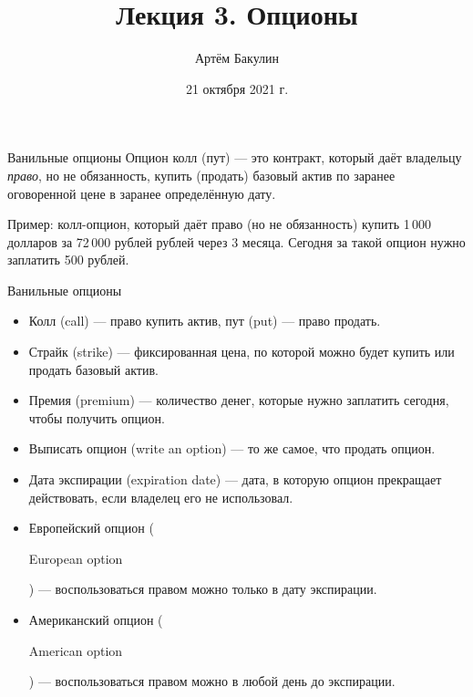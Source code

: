 \documentclass{beamer}
\title{Лекция 3. Опционы}
\author{Артём Бакулин}
\date{21 октября 2021 г.}
\newcommand{\en}[1]{\begin{otherlanguage}{english}#1\end{otherlanguage}}
\begin{document}
\begin{frame}
\titlepage
\end{frame}



\begin{frame}{Ванильные опционы}
\justifying
\alert{Опцион колл (пут)} --- это контракт, который даёт владельцу \textit{право}, но не обязанность, купить (продать) базовый актив по заранее оговоренной цене в заранее определённую дату. 

\justify
Пример: колл-опцион, который даёт право (но не обязанность) купить 1\,000 долларов за 72\,000 рублей рублей через 3 месяца. Сегодня за такой опцион нужно заплатить 500 рублей.
\end{frame}



\begin{frame}{Ванильные опционы}
\begin{itemize}
\justifying
\item Колл (call) --- право купить актив, пут (put) --- право продать.
\item Страйк (strike) --- фиксированная цена, по которой можно будет купить или продать базовый актив.
\item Премия (premium) --- количество денег, которые нужно заплатить сегодня, чтобы получить опцион.
\item Выписать опцион (write an option) --- то же самое, что продать опцион.
\item Дата экспирации (expiration date) --- дата, в которую опцион прекращает действовать, если владелец его не использовал.
\item Европейский опцион (\en{European option}) --- воспользоваться правом можно только в дату экспирации.
\item Американский опцион (\en{American option}) --- воспользоваться правом можно в любой день до экспирации.
\end{itemize}
\end{frame}



\newcommand{\circlewithtext}[3]{
    \node[circle, fill, inner sep = 1.5pt] at (#1, #2) {};
    \node[anchor = north] at (#1, #2) {#3};
}
\end{document}
